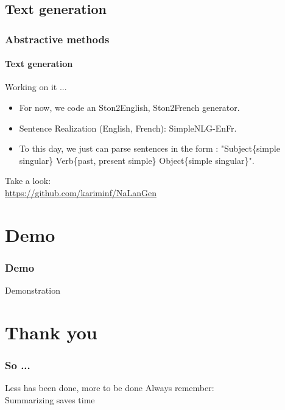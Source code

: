 \documentclass{beamer}
\begin{document}
\subsection{Text generation}
\begin{frame}
\frametitle{Abstractive methods}
\framesubtitle{Text generation}

Working on it ... \\

\begin{itemize}
\item For now, we code an Ston2English, Ston2French generator.
\item Sentence Realization (English, French): SimpleNLG-EnFr.
\item To this day, we just can parse sentences in the form : "Subject\{simple singular\} Verb\{past, present simple\} Object\{simple singular\}". 
\end{itemize}
\vfill
Take a look:\\
\url{https://github.com/kariminf/NaLanGen}

\end{frame}

\section{Demo}
\begin{frame}
\frametitle{Demo}

\begin{center}
{\Huge Demonstration}
\end{center}

\end{frame}

\section{Thank you}
\begin{frame}
\frametitle{So ...}

\begin{center}
{\huge Less has been done, more to be done}
\vfill
{\LARGE Always remember:}
\\
{\Huge Summarizing saves time}
\end{center}

\end{frame}


\end{document}
